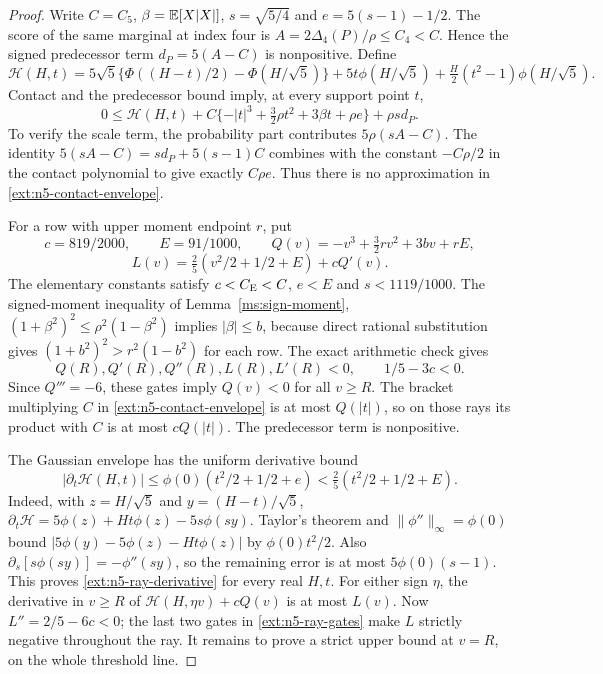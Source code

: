 \begin{proof}
Write $C=C_5$, $\beta=\mathbb E[X|X|]$, $s=\sqrt{5/4}$ and
$e=5(s-1)-1/2$. The score of the same marginal at index four is
$A=2\Delta_4(P)/\rho\le C_4<C$. Hence the signed predecessor term
$d_P=5(A-C)$ is nonpositive.
Define
\[
 \mathcal H(H,t)=5\sqrt5\{\Phi((H-t)/2)-\Phi(H/\sqrt5)\}
 +5t\phi(H/\sqrt5)+\tfrac H2(t^2-1)\phi(H/\sqrt5).
\]
Contact and the predecessor bound imply, at every support point $t$,
\begin{equation}\label{ext:n5-contact-envelope}
 0\le\mathcal H(H,t)
 +C\{-|t|^3+\tfrac32\rho t^2+3\beta t+\rho e\}
 +\rho s d_P.
\end{equation}
To verify the scale term, the probability part contributes
$5\rho(sA-C)$. The identity
$5(sA-C)=s d_P+5(s-1)C$ combines with the constant
$-C\rho/2$ in the contact polynomial to give exactly $C\rho e$.
Thus there is no approximation in \eqref{ext:n5-contact-envelope}.

For a row with upper moment endpoint $r$, put
\[
 c=819/2000,\qquad E=91/1000,\qquad
 Q(v)=-v^3+\tfrac32rv^2+3bv+rE,
\]
\[
 L(v)=\tfrac25(v^2/2+1/2+E)+cQ'(v).
\]
The elementary constants satisfy $c<C_{\mathrm E}<C$, $e<E$ and
$s<1119/1000$. The signed-moment inequality of Lemma~\ref{ms:sign-moment},
$(1+\beta^2)^2\le\rho^2(1-\beta^2)$ implies $|\beta|\le b$,
because direct rational substitution gives
$(1+b^2)^2>r^2(1-b^2)$ for each row.
The exact arithmetic check gives
\begin{equation}\label{ext:n5-ray-gates}
 Q(R),Q'(R),Q''(R),L(R),L'(R)<0,
 \qquad 1/5-3c<0.
\end{equation}
Since $Q'''=-6$, these gates imply $Q(v)<0$ for all $v\ge R$.
The bracket multiplying $C$ in \eqref{ext:n5-contact-envelope} is
at most $Q(|t|)$, so on those rays its product with $C$ is at most
$cQ(|t|)$. The predecessor term is nonpositive.

The Gaussian envelope has the uniform derivative bound
\begin{equation}\label{ext:n5-ray-derivative}
 |\partial_t\mathcal H(H,t)|
 \le\phi(0)(t^2/2+1/2+e)
 <\tfrac25(t^2/2+1/2+E).
\end{equation}
Indeed, with $z=H/\sqrt5$ and $y=(H-t)/\sqrt5$,
$\partial_t\mathcal H=5\phi(z)+Ht\phi(z)-5s\phi(sy)$.
Taylor's theorem and $\|\phi''\|_\infty=\phi(0)$ bound
$|5\phi(y)-5\phi(z)-Ht\phi(z)|$ by $\phi(0)t^2/2$.
Also $\partial_s[s\phi(sy)]=-\phi''(sy)$, so the remaining
error is at most $5\phi(0)(s-1)$. This proves
\eqref{ext:n5-ray-derivative} for every real $H,t$.
For either sign $\eta$, the derivative in $v\ge R$ of
$\mathcal H(H,\eta v)+cQ(v)$ is at most $L(v)$.
Now $L''=2/5-6c<0$; the last two gates in
\eqref{ext:n5-ray-gates} make $L$ strictly negative throughout the ray.
It remains to prove a strict upper bound at $v=R$, on the whole
threshold line.


\end{proof}
